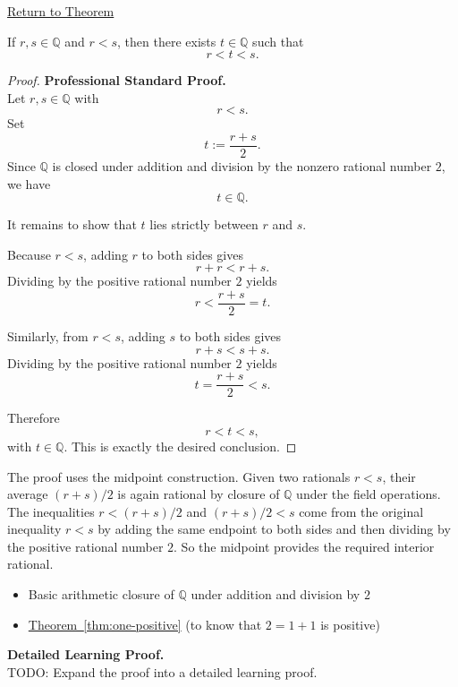 \newpage
{}
\label{prf:between-any-two-rationals-is-a-rational}

\begin{remark*}[Return]
\hyperref[thm:between-any-two-rationals-is-a-rational]{Return to Theorem}
\end{remark*}

\begin{theorem*}
If $r,s\in\mathbb{Q}$ and $r<s$, then there exists $t\in\mathbb{Q}$ such that
\[
r<t<s.
\]
\end{theorem*}

\begin{proof}
\textbf{Professional Standard Proof.}~\\
Let $r,s\in\mathbb{Q}$ with
\[
r<s.
\]
Set
\[
t:=\frac{r+s}{2}.
\]
Since $\mathbb{Q}$ is closed under addition and division by the nonzero
rational number $2$, we have
\[
t\in\mathbb{Q}.
\]

It remains to show that $t$ lies strictly between $r$ and $s$.

Because $r<s$, adding $r$ to both sides gives
\[
r+r<r+s.
\]
Dividing by the positive rational number $2$ yields
\[
r<\frac{r+s}{2}=t.
\]

Similarly, from $r<s$, adding $s$ to both sides gives
\[
r+s<s+s.
\]
Dividing by the positive rational number $2$ yields
\[
t=\frac{r+s}{2}<s.
\]

Therefore
\[
r<t<s,
\]
with $t\in\mathbb{Q}$.  This is exactly the desired conclusion.
\end{proof}

\begin{remark*}
The proof uses the midpoint construction.  Given two rationals $r<s$, their
average $(r+s)/2$ is again rational by closure of $\mathbb{Q}$ under the
field operations.  The inequalities $r<(r+s)/2$ and $(r+s)/2<s$ come from the
original inequality $r<s$ by adding the same endpoint to both sides and then
dividing by the positive rational number $2$.  So the midpoint provides the
required interior rational.
\end{remark*}

\begin{dependencies}
\begin{itemize}
  \item Basic arithmetic closure of $\mathbb{Q}$ under addition and division by $2$
  \item \hyperref[thm:one-positive]{Theorem~\ref*{thm:one-positive}}
        \textnormal{(to know that $2=1+1$ is positive)}
\end{itemize}
\end{dependencies}

\textbf{Detailed Learning Proof.}~\\
TODO: Expand the proof into a detailed learning proof.

